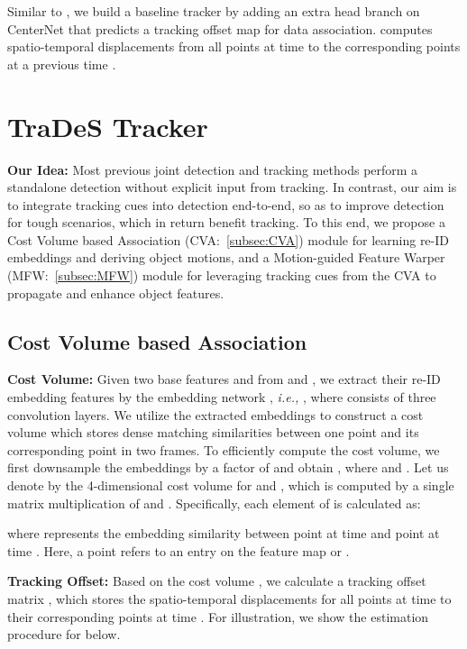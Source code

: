 \documentclass[final]{cvpr}
\newcommand{\myparagraph}[1]{{\vspace{0.5em} \noindent \bf #1}}
\begin{document}
Similar to \cite{CenterTrack}, we build a baseline tracker by adding an extra head branch on CenterNet that predicts a tracking offset map  for data association.  computes spatio-temporal displacements from all points at time  to the corresponding points at a previous time .

\section{TraDeS Tracker}
\vspace{-1mm}
\label{sec:trades}
\myparagraph{Our Idea:} Most previous joint detection and tracking methods perform a standalone detection without explicit input from tracking. In contrast, our aim is to integrate tracking cues into detection end-to-end, so as to improve detection for tough scenarios, which in return benefit tracking. To this end, we propose a Cost Volume based Association (CVA:~\cref{subsec:CVA}) module for learning re-ID embeddings and deriving object motions,  and a Motion-guided Feature Warper (MFW:~\cref{subsec:MFW}) module for leveraging tracking cues from the CVA to propagate and enhance object features.

\vspace{-1mm}
\subsection{Cost Volume based Association}
\vspace{-2mm}
\label{subsec:CVA}
\myparagraph{Cost Volume:} Given two base features  and  from  and , we extract their re-ID embedding features by the embedding network , \emph{i.e.,} , where   consists of three convolution layers. We utilize the extracted embeddings to construct a cost volume which stores dense matching similarities between one point and its corresponding point in two frames. To efficiently compute the cost volume, we first downsample the embeddings by a factor of  and obtain , where  and . Let us denote by  the 4-dimensional cost volume for  and , which is computed by a single matrix multiplication of  and . Specifically, each element of  is calculated as:
\vspace{-2mm}

where  represents the embedding similarity between point  at time  and point  at time . Here, a point refers to an entry on the feature map  or . 

\myparagraph{Tracking Offset:} Based on the cost volume , we calculate
a tracking offset matrix , which stores the spatio-temporal displacements for all points at time  to their corresponding points at time . For illustration, we show the estimation procedure for  below.
\end{document}
